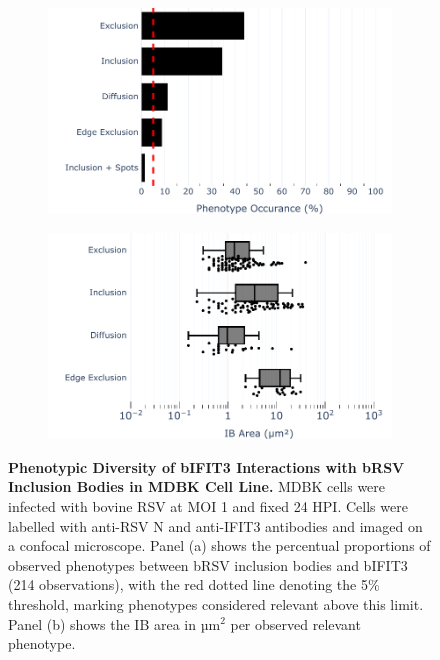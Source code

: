 \begin{figure}
    \begin{subfigure}{0.495\textwidth}
        \caption{}
        \includegraphics[width=1\linewidth]{08. Chapter 3/Figs/02. Infection/03. IFIT3/07. bar_i3_mdbk.pdf} 
    \end{subfigure}
    \begin{subfigure}{0.495\textwidth}
        \caption{}
        \includegraphics[width=1\linewidth]{08. Chapter 3/Figs/02. Infection/03. IFIT3/08. box_i3_mdbk.pdf}
    \end{subfigure}
    \caption[Phenotypic Diversity of bIFIT3 Interactions with bRSV Inclusion Bodies in MDBK Cell Line.]{\textbf{Phenotypic Diversity of bIFIT3 Interactions with bRSV Inclusion Bodies in MDBK Cell Line.} MDBK cells were infected with bovine RSV at MOI 1 and fixed 24 HPI. Cells were labelled with anti-RSV N and anti-IFIT3 antibodies and imaged on a confocal microscope. Panel (a) shows the percentual proportions of observed phenotypes between bRSV inclusion bodies and bIFIT3 (214 observations), with the red dotted line denoting the 5\% threshold, marking phenotypes considered relevant above this limit. Panel (b) shows the IB area in \(\mbox{µm}^2\) per observed relevant phenotype.}
    \label{fig:Phenotypic Diversity of bIFIT3 Interactions with bRSV Inclusion Bodies in MDBK Cell Line}
\end{figure}

